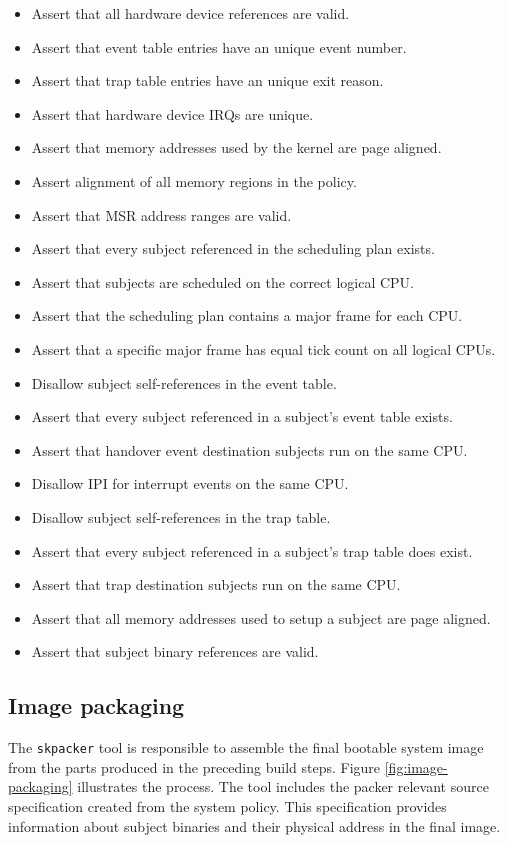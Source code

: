\begin{itemize}
	\item Assert that all hardware device references are valid.
	\item Assert that event table entries have an unique event number.
	\item Assert that trap table entries have an unique exit reason.
	\item Assert that hardware device IRQs are unique.
	\item Assert that memory addresses used by the kernel are page aligned.
	\item Assert alignment of all memory regions in the policy.
	\item Assert that MSR address ranges are valid.
	\item Assert that every subject referenced in the scheduling plan exists.
	\item Assert that subjects are scheduled on the correct logical CPU.
	\item Assert that the scheduling plan contains a major frame for each CPU.
	\item Assert that a specific major frame has equal tick count on all logical
		CPUs.
	\item Disallow subject self-references in the event table.
	\item Assert that every subject referenced in a subject's event table exists.
	\item Assert that handover event destination subjects run on the same CPU.
	\item Disallow IPI for interrupt events on the same CPU.
	\item Disallow subject self-references in the trap table.
	\item Assert that every subject referenced in a subject's trap table does
		exist.
	\item Assert that trap destination subjects run on the same CPU.
	\item Assert that all memory addresses used to setup a subject are page
		aligned.
	\item Assert that subject binary references are valid.
\end{itemize}

\subsection{Image packaging}\label{subsec:image-packaging}
The \texttt{skpacker} tool is responsible to assemble the final bootable system
image from the parts produced in the preceding build steps. Figure
\ref{fig:image-packaging} illustrates the process. The tool includes the packer
relevant source specification created from the system policy. This specification
provides information about subject binaries and their physical address in the
final image.


